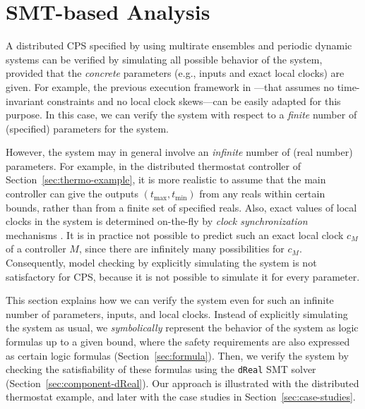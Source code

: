 \documentclass{sig-alternate}
\begin{document}
 


\section{SMT-based Analysis}

A distributed CPS specified 
by using multirate ensembles and periodic dynamic systems
can be verified by simulating all possible behavior of the system,
provided that the \emph{concrete} parameters (e.g., inputs and exact local clocks) are given.
For example, 
the previous execution framework in \cite{ftscs-journal}---that
assumes no time-invariant constraints and no local clock skews---can 
be easily adapted  for this purpose.
In this case, 
we can verify the system with respect to
a \emph{finite} number of (specified) parameters for the system.

However, 
the system may in general involve an \emph{infinite} number of 
(real number) parameters. %
For example, 
in the distributed thermostat controller of Section~\ref{sec:thermo-example},
it is more realistic to assume that 
the main controller can give
the outputs $(t_{\max}, t_{\min})$
from  any reals within certain bounds,
rather than from a finite set of specified reals.
Also, 
exact values of local clocks %
in the system 
is determined on-the-fly by 
\emph{clock synchronization} mechanisms \cite{pals-rtss09,lynch-book}.
It is in practice not possible to 
predict such an exact local clock $c_M$ of a controller $M$,
since there are infinitely many possibilities for $c_M$.
Consequently, 
model checking by explicitly simulating the system
is not satisfactory for CPS, %
because it is not possible to simulate it
for every parameter. 

This section explains how we can verify the system 
even for such an infinite number of  parameters, inputs, and local clocks.
Instead of explicitly simulating the system as usual,
we \emph{symbolically} represent the behavior of the system
as logic formulas
up to a given bound,
where the safety requirements %
are also expressed as certain logic formulas
(Section~\ref{sec:formula}).
Then, we verify the system %
by checking the satisfiability of these formulas
using the \texttt{dReal} SMT solver (Section~\ref{sec:component-dReal}).
Our approach is illustrated with the distributed thermostat example,
and later with the case studies in Section~\ref{sec:case-studies}.
\end{document}
